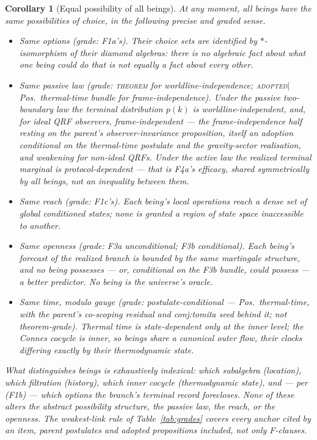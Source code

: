 \documentclass[11pt]{article}
\newtheorem{corollary}{Corollary}
\newcommand{\THM}{{\normalfont\scshape theorem}}                %
\newcommand{\ADOPTED}{{\normalfont\scshape adopted}}            %
\begin{document}
\begin{corollary}[Equal possibility of all beings]\label{cor:equal}
At any moment, all beings have the same possibilities of choice, in the
following precise and graded sense.
\begin{itemize}
\item[(i)] \emph{Same options} (grade: F1a's). Their choice sets are identified
by $*$-isomorphism of their diamond algebras: there is no algebraic fact about
what one being \emph{could do} that is not equally a fact about every other.
\item[(ii)] \emph{Same passive law} (grade: \THM{} for worldline-independence;
\ADOPTED{}$\mid$Pos.\ thermal-time bundle for frame-independence). Under the
passive two-boundary law the terminal distribution $p(k)$ is
worldline-independent,
and, for ideal QRF observers, frame-independent --- the frame-independence half
resting on the parent's observer-invariance proposition, itself an adoption
conditional on the thermal-time postulate and the gravity-sector realisation,
and weakening for non-ideal QRFs.
Under the \emph{active} law the realized terminal marginal is
protocol-dependent --- that is F4a's efficacy, shared symmetrically by all
beings, not an inequality between them.
\item[(iii)] \emph{Same reach} (grade: F1c's). Each being's local operations
reach a dense set of global conditioned states; none is granted a region of
state space inaccessible to another.
\item[(iv)] \emph{Same openness} (grade: F3a unconditional; F3b conditional).
Each being's forecast of the realized branch is bounded by the same martingale
structure, and no being possesses --- or, conditional on the F3b bundle, could
possess --- a better predictor. No being is the universe's oracle.
\item[(v)] \emph{Same time, modulo gauge} (grade: postulate-conditional ---
Pos.\ thermal-time, with the parent's co-scoping residual and
\textsf{conj:tomita} seed behind it; not theorem-grade). Thermal time is
state-dependent only at the inner level; the Connes cocycle is inner, so beings
share a canonical outer flow, their clocks differing exactly by their
thermodynamic state.
\end{itemize}
What distinguishes beings is exhaustively indexical: \emph{which} subalgebra
(location), \emph{which} filtration (history), \emph{which} inner cocycle
(thermodynamic state), and --- per (F1b) --- which options the branch's terminal
record forecloses. None of these alters the abstract possibility structure, the
passive law, the reach, or the openness. The weakest-link rule of
Table~\ref{tab:grades} covers every anchor cited by an item, parent postulates
and adopted propositions included, not only F-clauses.
\end{corollary}
\end{document}
